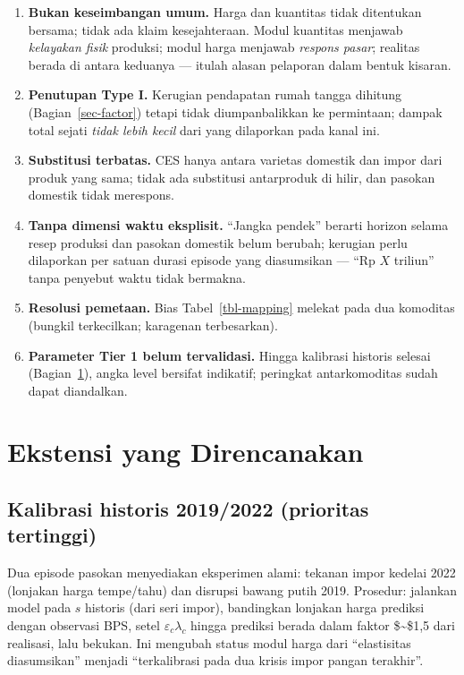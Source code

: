 \documentclass[
  manuscript=article,
  layout=publish,
  year=2026,
  volume=1,
]{den}
\providecommand{\tightlist}{%
  \setlength{\itemsep}{0pt}\setlength{\parskip}{0pt}}
\begin{document}
\begin{enumerate}
\def\labelenumi{\arabic{enumi}.}
\tightlist
\item
  \textbf{Bukan keseimbangan umum.} Harga dan kuantitas tidak ditentukan
  bersama; tidak ada klaim kesejahteraan. Modul kuantitas menjawab
  \emph{kelayakan fisik} produksi; modul harga menjawab \emph{respons
  pasar}; realitas berada di antara keduanya --- itulah alasan pelaporan
  dalam bentuk kisaran.
\item
  \textbf{Penutupan Type I.} Kerugian pendapatan rumah tangga dihitung
  (Bagian~\ref{sec-factor}) tetapi tidak diumpanbalikkan ke permintaan;
  dampak total sejati \emph{tidak lebih kecil} dari yang dilaporkan pada
  kanal ini.
\item
  \textbf{Substitusi terbatas.} CES hanya antara varietas domestik dan
  impor dari produk yang sama; tidak ada substitusi antarproduk di
  hilir, dan pasokan domestik tidak merespons.
\item
  \textbf{Tanpa dimensi waktu eksplisit.} ``Jangka pendek'' berarti
  horizon selama resep produksi dan pasokan domestik belum berubah;
  kerugian perlu dilaporkan per satuan durasi episode yang diasumsikan
  --- ``Rp \(X\) triliun'' tanpa penyebut waktu tidak bermakna.
\item
  \textbf{Resolusi pemetaan.} Bias Tabel~\ref{tbl-mapping} melekat pada
  dua komoditas (bungkil terkecilkan; karagenan terbesarkan).
\item
  \textbf{Parameter Tier 1 belum tervalidasi.} Hingga kalibrasi historis
  selesai (Bagian~\ref{sec-ext}), angka level bersifat indikatif;
  peringkat antarkomoditas sudah dapat diandalkan.
\end{enumerate}

\section{Ekstensi yang Direncanakan}\label{sec-ext}

\subsection{Kalibrasi historis 2019/2022 (prioritas
tertinggi)}\label{kalibrasi-historis-20192022-prioritas-tertinggi}

Dua episode pasokan menyediakan eksperimen alami: tekanan impor kedelai
2022 (lonjakan harga tempe/tahu) dan disrupsi bawang putih 2019.
Prosedur: jalankan model pada \(s\) historis (dari seri impor),
bandingkan lonjakan harga prediksi dengan observasi BPS, setel
\(\varepsilon_c \lambda_c\) hingga prediksi berada dalam faktor
\$\sim\$1,5 dari realisasi, lalu bekukan. Ini mengubah status modul
harga dari ``elastisitas diasumsikan'' menjadi ``terkalibrasi pada dua
krisis impor pangan terakhir''.
\end{document}
